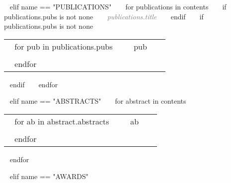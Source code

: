 \begin{minipage}{\textwidth}
%

~{ elif name == "PUBLICATIONS" }~
~{ for publications in contents }~
  ~{ if publications.pubs is not none }~ 
  \textcolor{gray}{{\emph{~{{ publications.title }}~}}} 
  ~{ endif }~
  ~{ if publications.pubs is not none }~ 
    \begin{tabular}{ p{} %
                     p{} 
                     p{}} %
    ~{ for pub in publications.pubs }~
      \small\textcolor{gray}{{\emph{  }}} & {~{{ pub }}~} & {\hfill \small{ }} \\ \\
    ~{ endfor }~ 
    \end{tabular}
  ~{ endif }~
~{ endfor }~

%

~{ elif name == "ABSTRACTS" }~
~{ for abstract in contents }~
  \begin{tabular}{ p{} %
                   p{} 
                   p{}} %
  ~{ for ab in abstract.abstracts }~
  \small\textcolor{gray}{{\emph{  }}} & {~{{ ab }}~} & {\hfill \small{ }} \\ \\
  ~{ endfor }~
  \end{tabular}
~{ endfor }~

%

~{ elif name == "AWARDS" }~


\end{minipage}
